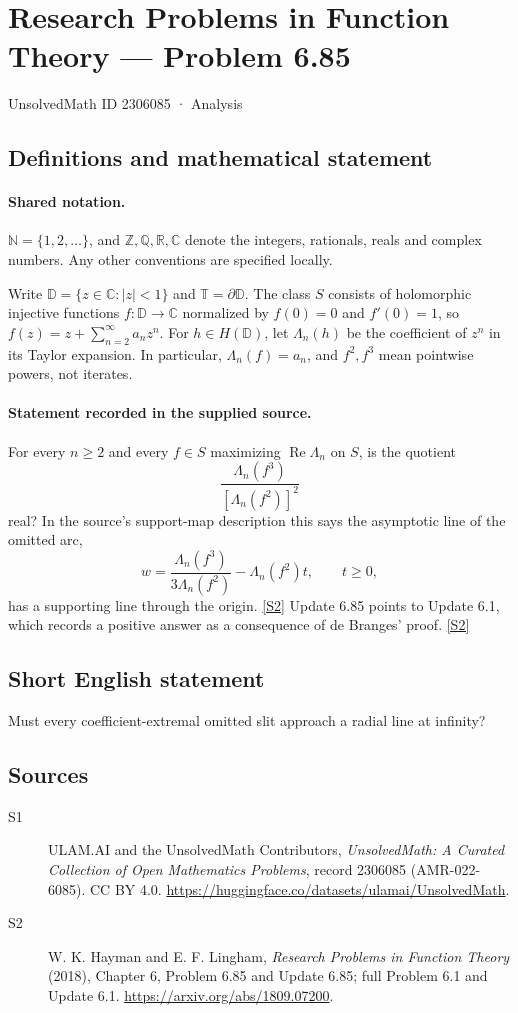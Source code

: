 \documentclass[11pt]{article}
\newcommand{\sref}[2]{\hyperlink{source:#1:#2}{[S#2]}}
\begin{document}
\setcounter{section}{2306084}
\section{Research Problems in Function Theory — Problem 6.85}\label{2306085}
{\small\sffamily UnsolvedMath ID 2306085 · Analysis}
\subsection{Definitions and mathematical statement}

\paragraph{Shared notation.}$\mathbb N=\{1,2,\ldots\}$, and $\mathbb Z,\mathbb Q,\mathbb R,\mathbb C$ denote the integers, rationals, reals and complex numbers. Any other conventions are specified locally.


Write $\mathbb D=\{z\in\mathbb C:|z|<1\}$ and $\mathbb T=\partial\mathbb D$. The class $S$ consists of holomorphic injective functions $f:\mathbb D\to\mathbb C$ normalized by $f(0)=0$ and $f'(0)=1$, so $f(z)=z+\sum_{n=2}^{\infty}a_nz^n$. For $h\in H(\mathbb D)$, let $\Lambda_n(h)$ be the coefficient of $z^n$ in its Taylor expansion. In particular, $\Lambda_n(f)=a_n$, and $f^2,f^3$ mean pointwise powers, not iterates.
\paragraph{Statement recorded in the supplied source.}
For every $n\ge2$ and every $f\in S$ maximizing $\operatorname{Re}\Lambda_n$ on $S$, is the quotient \[\frac{\Lambda_n(f^3)}{[\Lambda_n(f^2)]^2}\] real? In the source's support-map description this says the asymptotic line of the omitted arc, \[w=\frac{\Lambda_n(f^3)}{3\Lambda_n(f^2)}-\Lambda_n(f^2)t,\qquad t\ge0,\] has a supporting line through the origin. \sref{2306085}{2}
Update 6.85 points to Update 6.1, which records a positive answer as a consequence of de Branges' proof. \sref{2306085}{2}
\subsection{Short English statement}
Must every coefficient-extremal omitted slit approach a radial line at infinity?
\subsection{Sources}
\begin{description}
\item[\hypertarget{source:2306085:1}{S1}] ULAM.AI and the UnsolvedMath Contributors, \emph{UnsolvedMath: A Curated Collection of Open Mathematics Problems}, record 2306085 (AMR-022-6085). CC BY 4.0. \url{https://huggingface.co/datasets/ulamai/UnsolvedMath}.
\item[\hypertarget{source:2306085:2}{S2}] W. K. Hayman and E. F. Lingham, \emph{Research Problems in Function Theory} (2018), Chapter 6, Problem 6.85 and Update 6.85; full Problem 6.1 and Update 6.1. \url{https://arxiv.org/abs/1809.07200}.
\end{description}
\label{end:2306085}
\end{document}
